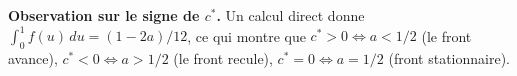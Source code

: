 \documentclass[11pt,a4paper]{report}
\newtheorem{theorem}{Theoreme}[chapter]
\begin{document}

\textbf{Observation sur le signe de $c^*$.} Un calcul direct donne
$\int_0^1 f(u)\,du = (1-2a)/12$, ce qui montre que $c^*>0\Leftrightarrow a<1/2$
(le front avance), $c^*<0\Leftrightarrow a>1/2$ (le front recule),
$c^*=0\Leftrightarrow a=1/2$ (front stationnaire).
\end{document}
